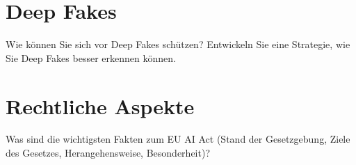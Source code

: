 \documentclass[12pt,ngerman]{AssignmentClass}
\begin{document}
    
    \section{Deep Fakes}
        Wie können Sie sich vor Deep Fakes schützen? Entwickeln Sie eine Strategie, wie Sie Deep Fakes besser erkennen können.

    
    \section{Rechtliche Aspekte}
        Was sind die wichtigsten Fakten zum EU AI Act (Stand der Gesetzgebung, Ziele des Gesetzes, Herangehensweise, Besonderheit)? 

 
\end{document}

